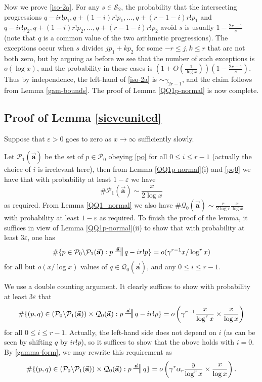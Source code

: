 \documentclass[11pt]{amsart}
\numberwithin{equation}{section}  %
\theoremstyle{remark}
\theoremstyle{plain}
\numberwithin{equation}{section}
\newcommand{\eps}{\ensuremath{\varepsilon}}
\renewcommand{\leq}{\leqslant}
\renewcommand{\(}{\left(}
\renewcommand{\)}{\right)}
\newcommand{\asym}{\sim}   %
\newcommand{\relra}{\nsdtstile{}{\vect{\mathbf{a}}}} %
\newcommand{\vect}[1]{{\ensuremath{\vec{#1}}}}
\newcommand{\PP}{\mathcal{P}}
\newcommand{\QQ}{\mathcal{Q}}
\newcommand{\cS}{\mathcal{S}}
\begin{document}
Now we prove \eqref{iso-2a}.  For any $s \in \cS_2$, the probability that the intersecting progressions $q-ir!p_1, q+(1-i)r!p_1,\dots, q+(r-1-i)r! p_1$ and $q-ir!p_2, q+(1-i)r!p_2,\dots, q+(r-1-i)r! p_2$ avoid $s$ is usually $1 - \frac{2r-1}{s}$ (note that $q$ is a common value of the two arithmetic progressions).  The exceptions occur when $s$ divides $jp_1+kp_2$ for some $-r \leq j,k \leq r$ that are not both zero, but by arguing as before we see that the number of such exceptions is $o(\log x)$, and the probability in these cases is $(1 + O(\frac{1}{\log x})) (1 - \frac{2r-1}{s})$.  Thus by independence, the left-hand of \eqref{iso-2a} is $\asym \gamma_{2r-1}$, and the claim follows from Lemma \ref{gam-bounds}.  The proof of Lemma \ref{QQ1p-normal} is now complete.

\subsection{Proof of Lemma \ref{sieveunited}}

Suppose that $\eps>0$ goes to zero as $x \to \infty$ sufficiently
slowly.

Let $\PP_1(\vect{\mathbf{a}})$ be the set of $p \in \PP_0$ obeying \eqref{po} for all $0 \leq i \leq r-1$ (actually the choice of $i$ is irrelevant here), then from Lemma \ref{QQ1p-normal}(i) and \eqref{pq0} we have that with probability at least $1-\eps$ we have
\begin{equation}\label{pp1}
 \# \PP_1(\vect{\mathbf{a}}) \asym \frac{x}{2\log x}
\end{equation}
as required.  From Lemma \ref{QQ1_normal} we also have $ \# \QQ_0(\vect{\mathbf{a}}) \asym \frac{r}{2\log r} \frac{x}{\log x}$ with probability at least $1-\eps$ as required.  To finish the proof of the lemma, it suffices in view of Lemma \ref{QQ1p-normal}(ii) to show that with probability at least $3\eps$, one has
$$ 
\#  \{ p \in \PP_0 \backslash \PP_1(\vect{\mathbf{a}}):  p \relra q - ir! p \} = o( \gamma^{r-1} x / \log^r x )$$
for all but $o(x/\log x)$ values of $q \in \QQ_0(\vect{\mathbf{a}})$, and any $0 \leq i \leq r-1$.  

We use a double counting argument.  It clearly suffices to show with probability at least $3\eps$ that
$$ 
\#  \{ (p,q) \in (\PP_0 \backslash \PP_1(\vect{\mathbf{a}})) \times \QQ_0(\vect{\mathbf{a}}):  p \relra q - ir! p \} = o\left( \gamma^{r-1} \frac{x}{\log^r x} \times \frac{x}{\log x} \right)
$$
for all $0 \leq i \leq r-1$.  Actually, the left-hand side does not
depend on $i$ (as can be seen by shifting $q$ by $ir! p$), so it
suffices to show that the above holds with $i=0$.
By \eqref{gamma-form}, we may rewrite this requirement as
$$ 
\#  \{ (p,q) \in (\PP_0 \backslash \PP_1(\vect{\mathbf{a}})) \times \QQ_0(\vect{\mathbf{a}}):  p \relra q \} = o\left( \gamma^r \alpha_r \frac{y}{\log^r x} \times \frac{x}{\log x} \right).
$$
\end{document}
